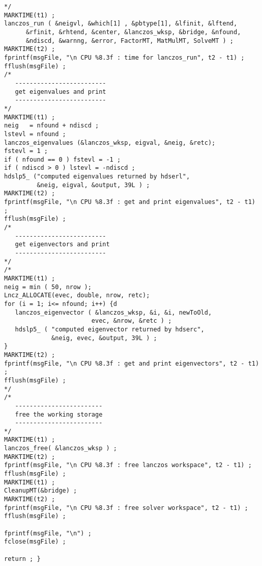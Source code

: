 \begin{verbatim}
*/
MARKTIME(t1) ;
lanczos_run ( &neigvl, &which[1] , &pbtype[1], &lfinit, &lftend, 
	  &rfinit, &rhtend, &center, &lanczos_wksp, &bridge, &nfound, 
	  &ndiscd, &warnng, &error, FactorMT, MatMulMT, SolveMT ) ;
MARKTIME(t2) ;
fprintf(msgFile, "\n CPU %8.3f : time for lanczos_run", t2 - t1) ;
fflush(msgFile) ;
/*
   -------------------------
   get eigenvalues and print
   -------------------------
*/
MARKTIME(t1) ;
neig   = nfound + ndiscd ;
lstevl = nfound ;
lanczos_eigenvalues (&lanczos_wksp, eigval, &neig, &retc);
fstevl = 1 ;
if ( nfound == 0 ) fstevl = -1 ;
if ( ndiscd > 0 ) lstevl = -ndiscd ;
hdslp5_ ("computed eigenvalues returned by hdserl",
         &neig, eigval, &output, 39L ) ;
MARKTIME(t2) ;
fprintf(msgFile, "\n CPU %8.3f : get and print eigenvalues", t2 - t1) ;
fflush(msgFile) ;
/*
   -------------------------
   get eigenvectors and print
   -------------------------
*/
/*
MARKTIME(t1) ;
neig = min ( 50, nrow );
Lncz_ALLOCATE(evec, double, nrow, retc);
for (i = 1; i<= nfound; i++) {d
   lanczos_eigenvector ( &lanczos_wksp, &i, &i, newToOld,
                        evec, &nrow, &retc ) ;
   hdslp5_ ( "computed eigenvector returned by hdserc",
             &neig, evec, &output, 39L ) ;
}
MARKTIME(t2) ;
fprintf(msgFile, "\n CPU %8.3f : get and print eigenvectors", t2 - t1) ;
fflush(msgFile) ;
*/
/*
   ------------------------
   free the working storage
   ------------------------
*/
MARKTIME(t1) ;
lanczos_free( &lanczos_wksp ) ;
MARKTIME(t2) ;
fprintf(msgFile, "\n CPU %8.3f : free lanczos workspace", t2 - t1) ;
fflush(msgFile) ;
MARKTIME(t1) ;
CleanupMT(&bridge) ;
MARKTIME(t2) ;
fprintf(msgFile, "\n CPU %8.3f : free solver workspace", t2 - t1) ;
fflush(msgFile) ;

fprintf(msgFile, "\n") ;
fclose(msgFile) ;

return ; }

\end{verbatim}

